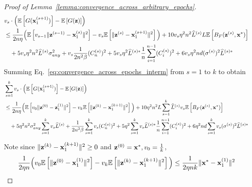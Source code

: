 \begin{proof}[Proof of Lemma~\ref{lemma:convergence_across_arbitrary_epochs}]
    \begin{align}
    \label{eq:convergence_across_epochs_interm}
        &v_s \cdot \left(\mathbb{E}\left[G({\mathbf{x}}_1^{(s+1)})\right] - \mathbb{E}\left[G({\mathbf{z}})\right] \right)\\
        \nonumber
        &\leq  \frac{1}{2 n \eta}\Big( \mathbb{E}\left[ v_{s-1} \|{\mathbf{z}}^{(s-1)} - {\mathbf{x}}_1^{(s)}\|^2\right]  - v_s \mathbb{E}\left[ \|{\mathbf{z}}^{(s)} - {\mathbf{x}}_1^{(s+1)}\|^2 \right] \Big)
        + 10 v_s \eta^2 n^2 \widehat{L}^{(s)} L \mathbb{E}\left[  B_F({\mathbf{z}}^{(s)}, {\mathbf{x}}^*)\right]\\
        \nonumber
        &\quad + 5 v_s \eta^2 n^2 \widehat{L}^{(s)}\sigma_{any}^2
        + v_s \frac{1}{2n^2 \beta}(C_n^{(s)})^2 
         +  5v_s \eta^2 \widehat{L}^{(s)*} \frac{1}{n} \sum_{i=1}^{n-1}(C_i^{(s)})^2
         + 6 v_s \eta^2 nd (\sigma^{(s)})^2 \widehat{L}^{(s)*}
    \end{align}
    Summing Eq.~\ref{eq:convergence_across_epochs_interm} from $s = 1$ to $k$ to obtain
    \begin{align}
    \label{eq:telescoping_sum_result}
        &\sum_{s=1}^{k} v_s \cdot \left(\mathbb{E}\left[G({\mathbf{x}}_1^{(s+1)})\right] - \mathbb{E}\left[G({\mathbf{z}})\right] \right)\\
        \nonumber
        &\leq \frac{1}{2 n \eta} \Big(\mathbb{E}\left[ v_0 \| {\mathbf{z}}^{(0)} - {\mathbf{z}}_1^{(1)}\|^2 \right]
        - v_{k}\mathbb{E}\left[\| {\mathbf{z}}^{(k)} - {\mathbf{x}}_1^{(k+1)}\|^2\right]\Big)
        + 10 \eta^2 n^2 L \sum_{s=1}^{k} \widehat{L}^{(s)} v_s \mathbb{E}\left[B_F({\mathbf{z}}^{(s)}, {\mathbf{x}}^*)\right]\\
        \nonumber
        &\quad + 5\eta^2 n^2 \sigma_{any}^2 \sum_{s=1}^{k} v_s \widehat{L}^{(s)}
        + \frac{1}{2n^2 \beta}\sum_{s=1}^{k} v_s (C_n^{(s)})^2
        + 5\eta^2 \sum_{s=1}^{k} v_s \widehat{L}^{(s)*} \frac{1}{n}\sum_{i=1}^{n-1}(C_i^{(s)})^2
        + 6\eta^2 nd \sum_{s=1}^{k} v_s (\sigma^{(s)})^2 \widehat{L}^{(s)*}
    \end{align}

     Note since $\|{\mathbf{z}}^{(k)} - {\mathbf{x}}_1^{(k+1)}\|^2 \geq 0$ and ${\mathbf{z}}^{(0)} = {\mathbf{x}}^*, v_0 = \frac{1}{k}$,
    \begin{align}
    \label{eq:convergence_across_epochs_tele_sum}
        \frac{1}{2\eta n}\Big( v_0 \mathbb{E}\left[ \| {\mathbf{z}}^{(0)} - {\mathbf{x}}_1^{(1)}\|^2 \right] - v_k \mathbb{E}\left[ \| {\mathbf{z}}^{(k)} - {\mathbf{x}}_1^{(k+1)} \|^2 \right] \Big)
        \leq \frac{1}{2\eta n k} \| {\mathbf{x}}^* - {\mathbf{x}}_1^{(1)}\|^2 
    \end{align}


\end{proof}
